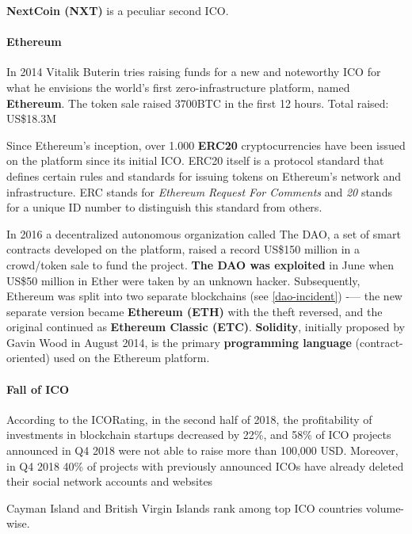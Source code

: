 \textbf{NextCoin (NXT)} is a peculiar second ICO.

\paragraph{Ethereum}
In 2014 Vitalik Buterin tries raising funds for a new and noteworthy ICO for what he envisions the world's first zero-infrastructure platform, named \textbf{Ethereum}.
The token sale raised 3700BTC in the first 12 hours.
Total raised: US\$18.3M

Since Ethereum's inception, over 1.000 \textbf{ERC20} cryptocurrencies have been issued on the platform since its initial ICO. ERC20 itself is a protocol standard that defines certain rules and standards for issuing tokens on Ethereum's network and infrastructure. ERC stands for \emph{Ethereum Request For Comments} and \emph{20} stands for a unique ID number to distinguish this standard from others.

In 2016 a decentralized autonomous organization called The DAO, a set of smart contracts developed on the platform, raised a record US\$150 million in a crowd/token sale to fund the project. \textbf{The DAO was exploited} in June when US\$50 million in Ether were taken by an unknown hacker. Subsequently, Ethereum was split into two separate blockchains (see \ref{dao-incident}) -— the new separate version became \textbf{Ethereum (ETH)} with the theft reversed, and the original continued as \textbf{Ethereum Classic (ETC)}.
\textbf{Solidity}, initially proposed by Gavin Wood in August 2014, is the primary \textbf{programming language} (contract-oriented) used on the Ethereum platform.

\paragraph{Fall of ICO}
According to the ICORating, in the second half of 2018, the profitability of investments in blockchain startups decreased by 22\%, and 58\% of ICO projects announced in Q4 2018 were not able to raise more than 100,000 USD. Moreover, in Q4 2018 40\% of projects with previously announced ICOs have already deleted their social network accounts and websites

Cayman Island and British Virgin Islands rank among top ICO countries volume-wise.

